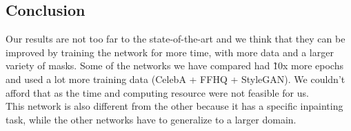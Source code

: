 \documentclass[10pt,twocolumn,letterpaper]{article}
\begin{document}
\subsection{Conclusion}
Our results are not too far to the state-of-the-art and we think that they can
be improved by training the network for more time, with more data and a larger
variety of masks. Some of the networks we have compared had \~10x more epochs
and used a lot more training data (CelebA + FFHQ + StyleGAN). We couldn't afford
that as the time and computing resource were not feasible for us.\\ This network
is also different from the other because it has a specific inpainting task, while
the other networks have to generalize to a larger domain.

{\small


}
\end{document}
